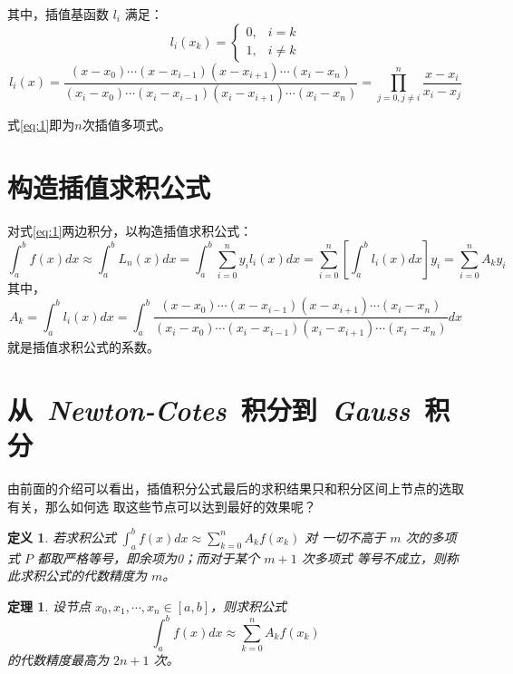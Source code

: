\documentclass[UTF8, 11pt, a4paper]{ctexart}
\newtheorem*{defi}{定义}
\newtheorem*{theo}{定理}
\begin{document}
\begin{spacing}{1.5}
其中，插值基函数 $l_i$ 满足：
\begin{equation*}
l_i(x_k) = \left\{
\begin{array}{rcl}
0,& i = k\\
1,& i \neq k
\end{array} \right.
\end{equation*}
\begin{equation}
l_{i}(x) = \dfrac{ (x-x_0)\cdots(x-x_{i-1})(x-x_{i+1})\cdots(x_i-x_n) }{ (x_i-x_0)
\cdots(x_i-x_{i-1})(x_i-x_{i+1})\cdots(x_i-x_n) } = \prod _{j=0,j \neq i}^{n}
\dfrac{x-x_i}{x_i-x_j}
\end{equation}

式\eqref{eq:1}即为$n$次插值多项式。

\section{构造插值求积公式}

对式\eqref{eq:1}两边积分，以构造插值求积公式：
\begin{equation}
\boxed{
\int _a^b f(x)dx \approx \int _a^b L_n(x)dx = \int_a^b \sum \limits _{i=0}^n
y_il_i(x)dx = \sum_{i=0}^n\left[ \int_a^b l_i (x) dx \right]y_i = \sum \limits
_{i=0}^{n}A_{k}y_i
}
\label{eq:3}
\end{equation}
其中，
\begin{equation}
A_k = \int_a^b l_i (x) dx = \int_a^b \dfrac{ (x-x_0)\cdots(x-x_{i-1})(x-x_{i+1})
\cdots(x_i-x_n) }{ (x_i-x_0)\cdots(x_i-x_{i-1})(x_i-x_{i+1})\cdots(x_i-x_n) }dx
\label{eq:4}
\end{equation}
就是插值求积公式的系数。
\section{从~\emph{Newton-Cotes}~积分到~\emph{Gauss}~积分}
由前面的介绍可以看出，插值积分公式最后的求积结果只和积分区间上节点的选取有关，那么如何选
取这些节点可以达到最好的效果呢？
\begin{defi}
若求积公式 $ \int _{a}^{b}f(x)dx \approx \sum \limits _{k=0}^{n} A_k f(x_k) $ 对
一切不高于 $ m $ 次的多项式 $ P $ 都取严格等号，即余项为0；而对于某个 $ m+1 $ 次多项式
等号不成立，则称此求积公式的代数精度为 $ m $。
\end{defi}
\begin{theo}
设节点 $ x_0, x_1, \cdots , x_n \in [a,b] $，则求积公式
$$ \int_a^b f(x) dx \approx \sum \limits _{k=0}^{n} A_k f(x_k) $$
的代数精度最高为 $ 2n+1 $ 次。
\end{theo}


\end{spacing}
\end{document}
